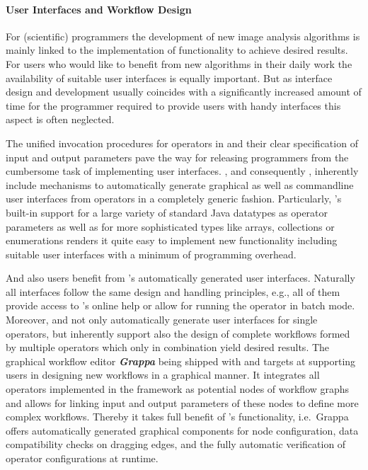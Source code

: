 \paragraph{User Interfaces and Workflow Design} For (scientific) programmers the development of new image analysis algorithms
is mainly linked to the implementation of functionality to achieve desired results. For users who would like to 
benefit from new algorithms in their daily work the availability of suitable user interfaces is equally important. 
But as interface design and development usually coincides with a significantly increased amount of time for the programmer 
required to provide users with handy interfaces this aspect is often neglected. 

The unified invocation procedures for operators in \alida and their clear specification of input and output parameters pave 
the way for releasing programmers from the cumbersome task of implementing user interfaces. \alida, and consequently \mitobo,
inherently include mechanisms to automatically generate graphical as well as commandline user interfaces from operators in a 
completely generic fashion. Particularly, \alida's built-in support for a large variety of standard Java datatypes as operator 
parameters as well as for more sophisticated types like arrays, collections or enumerations renders it quite easy to implement
new functionality including suitable user interfaces with a minimum of programming overhead. 

And also users benefit from \mitobo's automatically generated user interfaces. Naturally all interfaces 
follow the same design and handling principles, e.g., all of them provide access to \mitobo's online help or allow for running 
the operator in batch mode. Moreover, \alida and \mitobo not only automatically generate user interfaces for single operators, 
but inherently support also the design of complete workflows formed by multiple operators which only in combination yield 
desired results. The graphical workflow editor {\bf \em Grappa} being shipped with \alida and \mitobo targets at supporting 
users in designing new workflows in a graphical manner. It integrates all operators implemented in the \mitobo framework as 
potential nodes of workflow graphs and allows for linking input and output parameters of these nodes to define more 
complex workflows. Thereby it takes full benefit of \alida's functionality, i.e.~Grappa offers automatically generated graphical
components for node configuration, data compatibility checks on dragging edges, and the fully automatic verification of operator 
configurations at runtime.


